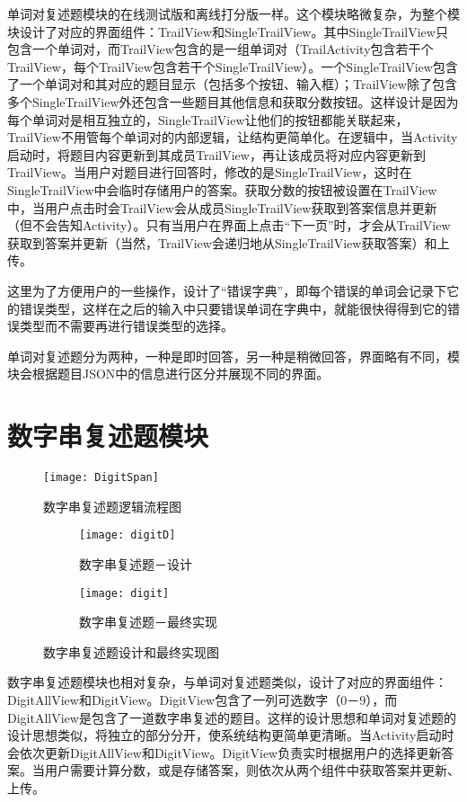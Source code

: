 单词对复述题模块的在线测试版和离线打分版一样。这个模块略微复杂，为整个模块设计了对应的界面组件：TrailView和SingleTrailView。其中SingleTrailView只包含一个单词对，而TrailView包含的是一组单词对（TrailActivity包含若干个TrailView，每个TrailView包含若干个SingleTrailView）。一个SingleTrailView包含了一个单词对和其对应的题目显示（包括多个按钮、输入框）；TrailView除了包含多个SingleTrailView外还包含一些题目其他信息和获取分数按钮。这样设计是因为每个单词对是相互独立的，SingleTrailView让他们的按钮都能关联起来，TrailView不用管每个单词对的内部逻辑，让结构更简单化。在逻辑中，当Activity启动时，将题目内容更新到其成员TrailView，再让该成员将对应内容更新到TrailView。当用户对题目进行回答时，修改的是SingleTrailView，这时在SingleTrailView中会临时存储用户的答案。获取分数的按钮被设置在TrailView中，当用户点击时会TrailView会从成员SingleTrailView获取到答案信息并更新（但不会告知Activity）。只有当用户在界面上点击“下一页”时，才会从TrailView获取到答案并更新（当然，TrailView会递归地从SingleTrailView获取答案）和上传。

这里为了方便用户的一些操作，设计了“错误字典”，即每个错误的单词会记录下它的错误类型，这样在之后的输入中只要错误单词在字典中，就能很快得得到它的错误类型而不需要再进行错误类型的选择。

单词对复述题分为两种，一种是即时回答，另一种是稍微回答，界面略有不同，模块会根据题目JSON中的信息进行区分并展现不同的界面。


\section{数字串复述题模块}

\begin{figure}[h]
\centering%
\texttt{[image: DigitSpan]}
\caption{数字串复述题逻辑流程图}
\label{fig:big1-subfigure}
\end{figure}

\begin{figure}[h]
\centering%
\begin{subfigure}{6cm}
\texttt{[image: digitD]}
\caption{数字串复述题－设计}
\end{subfigure}
\hspace{4em}%
\begin{subfigure}{6cm}
\texttt{[image: digit]}
\caption{数字串复述题－最终实现}
\end{subfigure}
\caption{数字串复述题设计和最终实现图}
\label{fig:big1-subfigure}
\end{figure}

数字串复述题模块也相对复杂，与单词对复述题类似，设计了对应的界面组件：DigitAllView和DigitView。DigitView包含了一列可选数字（0－9），而DigitAllView是包含了一道数字串复述的题目。这样的设计思想和单词对复述题的设计思想类似，将独立的部分分开，使系统结构更简单更清晰。当Activity启动时会依次更新DigitAllView和DigitView。DigitView负责实时根据用户的选择更新答案。当用户需要计算分数，或是存储答案，则依次从两个组件中获取答案并更新、上传。

